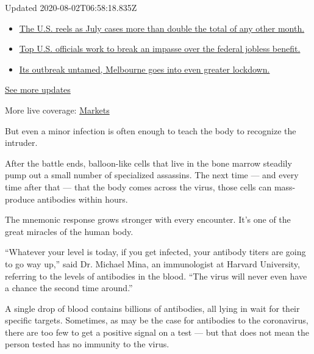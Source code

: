 Updated 2020-08-02T06:58:18.835Z

\begin{itemize}
\tightlist
\item
  \href{https://www.nytimes.com/2020/08/01/world/coronavirus-covid-19.html?action=click\&pgtype=Article\&state=default\&region=MAIN_CONTENT_1\&context=storylines_live_updates\#link-34047410}{The
  U.S. reels as July cases more than double the total of any other
  month.}
\item
  \href{https://www.nytimes.com/2020/08/01/world/coronavirus-covid-19.html?action=click\&pgtype=Article\&state=default\&region=MAIN_CONTENT_1\&context=storylines_live_updates\#link-780ec966}{Top
  U.S. officials work to break an impasse over the federal jobless
  benefit.}
\item
  \href{https://www.nytimes.com/2020/08/01/world/coronavirus-covid-19.html?action=click\&pgtype=Article\&state=default\&region=MAIN_CONTENT_1\&context=storylines_live_updates\#link-2bc8948}{Its
  outbreak untamed, Melbourne goes into even greater lockdown.}
\end{itemize}

\href{https://www.nytimes.com/2020/08/01/world/coronavirus-covid-19.html?action=click\&pgtype=Article\&state=default\&region=MAIN_CONTENT_1\&context=storylines_live_updates}{See
more updates}

More live coverage:
\href{https://www.nytimes.com/live/2020/07/31/business/stock-market-today-coronavirus?action=click\&pgtype=Article\&state=default\&region=MAIN_CONTENT_1\&context=storylines_live_updates}{Markets}

But even a minor infection is often enough to teach the body to
recognize the intruder.

After the battle ends, balloon-like cells that live in the bone marrow
steadily pump out a small number of specialized assassins. The next time
--- and every time after that --- that the body comes across the virus,
those cells can mass-produce antibodies within hours.

The mnemonic response grows stronger with every encounter. It's one of
the great miracles of the human body.

``Whatever your level is today, if you get infected, your antibody
titers are going to go way up,'' said Dr. Michael Mina, an immunologist
at Harvard University, referring to the levels of antibodies in the
blood. ``The virus will never even have a chance the second time
around.''

A single drop of blood contains billions of antibodies, all lying in
wait for their specific targets. Sometimes, as may be the case for
antibodies to the coronavirus, there are too few to get a positive
signal on a test --- but that does not mean the person tested has no
immunity to the virus.

